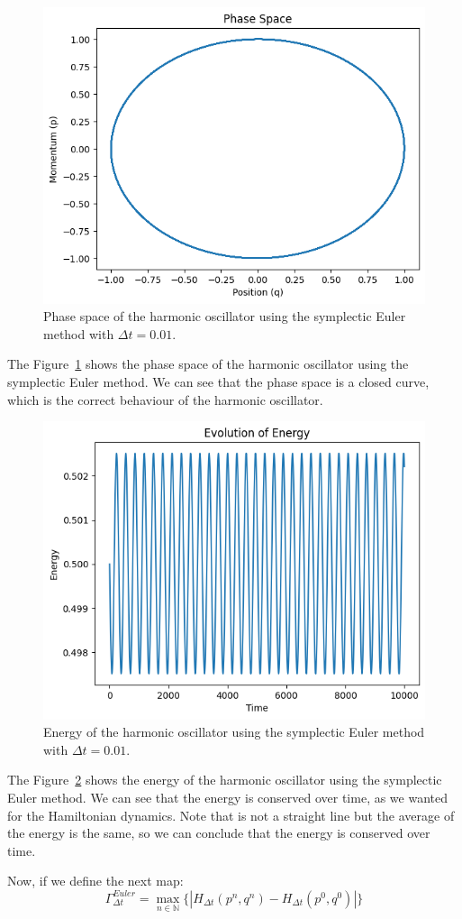 \documentclass{article}
\begin{document}
\begin{figure}[H]
	\centering
	\includegraphics[width=0.5\linewidth]{./Figures/Sympletic/eulerphase.png}
	\caption{Phase space of the harmonic oscillator using the symplectic Euler method with \(\Delta t = 0.01\).}
	\label{fig:eulerphase}
\end{figure}

The Figure~\ref{fig:eulerphase} shows the phase space of the harmonic oscillator using the symplectic Euler method. We can see that the phase space is a closed curve, which is the correct behaviour of the harmonic oscillator.

\begin{figure}[H]
	\centering
	\includegraphics[width=0.5\linewidth]{./Figures/Sympletic/eulerenergy.png}
	\caption{Energy of the harmonic oscillator using the symplectic Euler method with \(\Delta t = 0.01\).}
	\label{fig:eulerenergy}
\end{figure}

The Figure~\ref{fig:eulerenergy} shows the energy of the harmonic oscillator using the symplectic Euler method. We can see that the energy is conserved over time, as we wanted for the Hamiltonian dynamics. Note that is not a straight line but the average of the energy is the same, so we can conclude that the energy is conserved over time.

Now, if we define the next map:
\[
	\Gamma_{\Delta t}^{Euler} = \max_{n \in \mathbb{N}}\{|H_{\Delta t}(p^n, q^n) - H_{\Delta t}(p^0, q^0)|\}
\]
\end{document}
